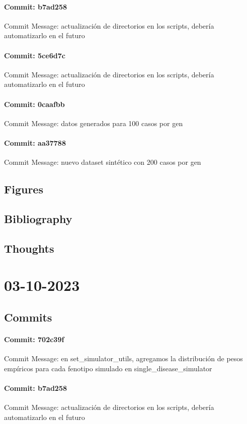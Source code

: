 \documentclass{article}
\begin{document}
\paragraph{Commit: b7ad258}
Commit Message: actualización de directorios en los scripts, debería automatizarlo en el futuro

\paragraph{Commit: 5ce6d7c}
Commit Message: actualización de directorios en los scripts, debería automatizarlo en el futuro

\paragraph{Commit: 0caafbb}
Commit Message: datos generados para 100 casos por gen

\paragraph{Commit: aa37788}
Commit Message: nuevo dataset sintético con 200 casos por gen

\subsection{Figures}
\subsection{Bibliography}
\subsection{Thoughts}

\section{03-10-2023}
\subsection{Commits}
\paragraph{Commit: 702c39f}
Commit Message: en set_simulator_utils, agregamos la distribución de pesos empíricos para cada fenotipo simulado en single_disease_simulator

\paragraph{Commit: b7ad258}
Commit Message: actualización de directorios en los scripts, debería automatizarlo en el futuro
\end{document}
